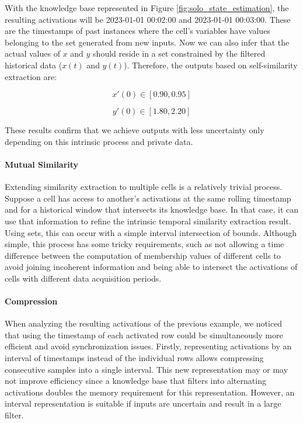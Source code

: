 With the knowledge base represented in Figure \ref{fig:solo_state_estimation}, the resulting activations will be 2023-01-01 00:02:00 and 2023-01-01 00:03:00. These are the timestamps of past instances where the cell's variables have values belonging to the set generated from new inputs. Now we can also infer that the actual values of $x$ and $y$ should reside in a set constrained by the filtered historical data ($x(t)$ and $y(t)$). Therefore, the outputs based on self-similarity extraction are:

\begin{equation}
    x'(0) \in [0.90, 0.95]
\end{equation}

\begin{equation}
    y'(0) \in [1.80, 2.20]
\end{equation}

These results confirm that we achieve outputs with less uncertainty only depending on this intrinsic process and private data.

\paragraph{Mutual Similarity}

Extending similarity extraction to multiple cells is a relatively trivial process. Suppose a cell has access to another's activations at the same rolling timestamp and for a historical window that intersects its knowledge base. In that case, it can use that information to refine the intrinsic temporal similarity extraction result. Using sets, this can occur with a simple interval intersection of bounds. Although simple, this process has some tricky requirements, such as not allowing a time difference between the computation of membership values of different cells to avoid joining incoherent information and being able to intersect the activations of cells with different data acquisition periods.

\paragraph{Compression}

When analyzing the resulting activations of the previous example, we noticed that using the timestamp of each activated row could be simultaneously more efficient and avoid synchronization issues. Firstly, representing activations by an interval of timestamps instead of the individual rows allows compressing consecutive samples into a single interval.
This new representation may or may not improve efficiency since a knowledge base that filters into alternating activations doubles the memory requirement for this representation. However, an interval representation is suitable if inputs are uncertain and result in a large filter.



